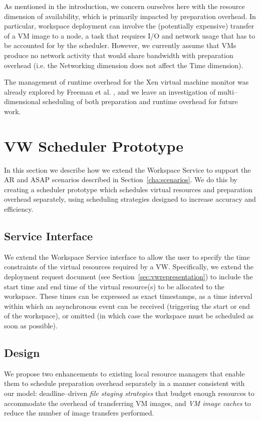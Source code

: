 \documentclass[singlespace]{ccw_chithesis}
\begin{document}
As mentioned in the introduction, we concern ourselves here with the resource dimension of availability, which is primarily impacted by preparation overhead. In particular, workspace deployment can involve the (potentially expensive) transfer of a VM image to a node, a task that requires I/O and network usage that has to be accounted for by the scheduler. However, we currently assume that VMs produce no network activity that would share bandwidth with preparation overhead (i.e. the Networking dimension does not affect the Time dimension).

The management of runtime overhead for the Xen virtual machine monitor was already explored by Freeman et al. \cite{DBLP:conf/icsoc/FreemanKFRSW06}, and we leave an investigation of multi--dimensional scheduling of both preparation and runtime overhead for future work.


\chapter{VW Scheduler Prototype}
\label{cha:scheduling}

In this section we describe how we extend the Workspace Service to support the AR and ASAP scenarios described in Section~\ref{cha:scenarios}. We do this by creating a scheduler prototype which schedules virtual resources and preparation overhead separately, using scheduling strategies designed to increase accuracy and efficiency.

\section{Service Interface}

We extend the Workspace Service interface to allow the user to specify the time constraints of the virtual resources required by a VW. Specifically, we extend the deployment request document (see Section~\ref{sec:vwrepresentation}) to include the start time and end time of the virtual resource(s) to be allocated to the workspace. These times can be expressed as exact timestamps, as a time interval within which an asynchronous event can be received (triggering the start or end of the workspace), or omitted (in which case the workspace must be scheduled as soon as possible).

\section{Design}

We propose two enhancements to existing local resource managers that enable them to schedule preparation overhead separately in a manner consistent with our model: deadline--driven \emph{file staging strategies} that budget enough resources to accommodate the overhead of transferring VM images, and \emph{VM image caches} to reduce the number of image transfers performed.
\end{document}
